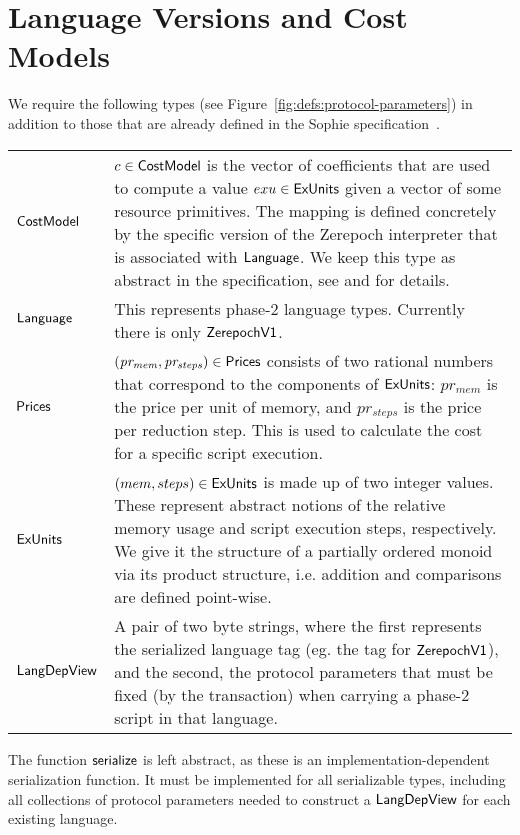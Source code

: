 \section{Language Versions and Cost Models}
\label{sec:protocol-parameters}

We require the following types (see Figure~\ref{fig:defs:protocol-parameters})
in addition to those that are already defined in the Sophie specification~\cite{sophie_spec}.

\vspace{12pt}
\begin{tabular}{lp{5in}}
  $\mathsf{CostModel}$ &
  $c\in\mathsf{CostModel}$ is the vector of coefficients that are used to compute
  a value $exu\in\mathsf{ExUnits}$ given a vector of some resource primitives. The mapping is defined
  concretely by the specific version of the Zerepoch interpreter that is associated with $\mathsf{Language}$.
  We keep this type as abstract in the specification, see \cite{zerepochcore} and \cite{zerepochtech}
  for details.
  \\
  $\mathsf{Language}$ &
  This represents phase-2 language types. Currently there is only $\mathsf{ZerepochV1}$.
  \\
  $\mathsf{Prices}$ &
  $\mathit{(pr_{mem}, pr_{steps})}\in \mathsf{Prices}$ consists of two rational numbers
  that correspond to the components of $\mathsf{ExUnits}$:
  $pr_{mem}$ is the price per unit of memory, and $pr_{steps}$ is the price per
  reduction step. This is used to calculate the cost for a specific script execution.
  \\
  $\mathsf{ExUnits}$ &
  $(mem, steps)\in \mathsf{ExUnits}$ is made up of two integer values.
  These represent abstract notions of the relative memory usage and script execution steps,
  respectively. We give it the structure of a partially ordered monoid via its product structure, i.e. addition and comparisons are defined point-wise.
  \\
  $\mathsf{LangDepView}$ &
  A pair of two byte strings, where the first represents the serialized language tag (eg. the tag for $\mathsf{ZerepochV1}$),
  and the second, the protocol parameters that must be fixed (by the transaction) when carrying a phase-2 script
  in that language.
\end{tabular}

The function $\mathsf{serialize}$ is left abstract, as
these is an implementation-dependent serialization function. It must
be implemented for all serializable types, including all
collections of protocol parameters needed to construct a $\mathsf{LangDepView}$ for
each existing language.

